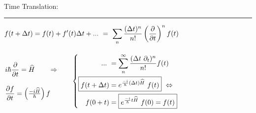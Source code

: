 \documentclass[12pt]{article}
\begin{document}
\hfill \break \\
Time Translation: \indent 
\rule[-60pt]{.5pt}{120pt} \indent
\( \begin{gathered}
    \displaystyle f(t + \Delta t) = f(t) + f'(t) \Delta t + ... 
        \ = \ \sum_n \frac{ (\Delta t)^n }{n!} 
        \left( \frac{\partial}{\partial t} \right)^n f(t) \\[10pt]
    \begin{aligned}
        &i\hbar \frac{\partial}{\partial t} = \widehat{H} 
            \hspace{20pt} \Rightarrow \hspace{20pt} \\[10pt]
        &\frac{\partial f}{\partial t} = \left( \tfrac{- i \widehat{H}}{\hbar} \right) f
    \end{aligned}
    \left\{ \begin{aligned}
        ... \ &= \sum_n^\infty \frac{ (\Delta t \ \partial_t)^n }{n!} f(t) \\
        \Aboxed{ f(t + \Delta t) &= e^{\frac{-i}{\hbar} (\Delta t) \widehat{H}} \ f(t) } \ \Leftrightarrow\\
        f(0 + t) &= \boxed{ e^{\frac{-i}{\hbar} t \widehat{H}} \ f(0) = f(t) }
    \end{aligned} \right.
\end{gathered} \)
\end{document}
